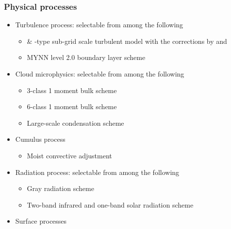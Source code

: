 \subsubsection{Physical processes}
\begin{itemize}
\item Turbulence process: selectable from among the following
  \begin{itemize}
  \item \citet{smagorinsky1963general} \& \citet{lilly1962numerical}-type sub-grid scale turbulent model
    with the corrections by \citet{brown1994largeeddy} and \citet{Scotti_1993}
  \item MYNN level 2.0 boundary layer scheme \cite{Nakanishi2006}
  \end{itemize}
\item Cloud microphysics: selectable from among the following
  \begin{itemize}
  \item 3-class 1 moment bulk scheme \citep{kessler_1969}
  \item 6-class 1 moment bulk scheme \citep{tomita_2008}
   \item Large-scale condensation scheme
  \end{itemize}
\item Cumulus process
  \begin{itemize}
  \item Moist convective adjustment \citep{manabe1965}
  \end{itemize}
\item Radiation process: selectable from among the following
  \begin{itemize}
    \item Gray radiation scheme \citep{Byrne2013,Frierson2006}
    \item Two-band infrared and one-band solar radiation scheme \citep{Geen2016,Vallis2018}
  \end{itemize}
\item Surface processes

\end{itemize}
